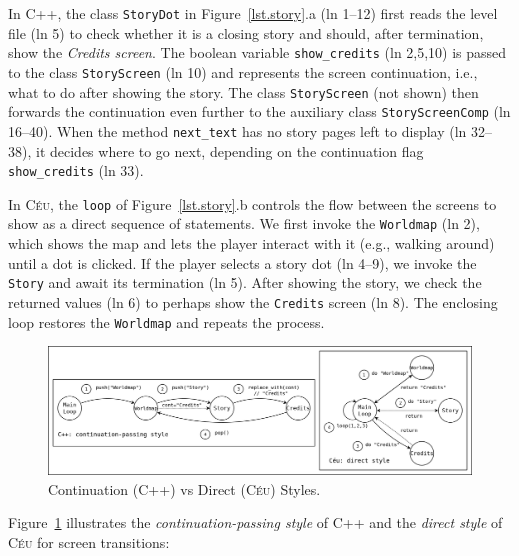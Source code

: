 \documentclass[times,twocolumn,final]{elsarticle}
\newcommand{\CEU}{\textsc{C\'{e}u}\xspace}
\newcommand{\code}[1] {{\small{\texttt{#1}}}}
\begin{document}
In C++, the class \code{StoryDot} in Figure~\ref{lst.story}.a (ln 1--12) first
reads the level file (ln 5) to check whether it is a closing story and should,
after termination, show the \emph{Credits screen}.
%
The boolean variable \code{show\_credits} (ln 2,5,10) is passed to the class
\code{StoryScreen} (ln 10) and represents the screen continuation, i.e., what
to do after showing the story.
The class \code{StoryScreen} (not shown) then forwards the continuation even
further to the auxiliary class \code{StoryScreenComp} (ln 16--40).
%
When the method \code{next\_text} has no story pages left to display
(ln 32--38), it decides where to go next, depending on the continuation flag
\code{show\_credits} (ln 33).

In \CEU, the \code{loop} of Figure~\ref{lst.story}.b controls the flow between
the screens to show as a direct sequence of statements.
%
We first invoke the \code{Worldmap} (ln 2), which shows the map and lets
the player interact with it (e.g., walking around) until a dot is clicked.
If the player selects a story dot (ln 4--9), we invoke the \code{Story}
and await its termination (ln 5).
After showing the story, we check the returned values (ln 6) to perhaps show
the \code{Credits} screen (ln 8).
The enclosing loop restores the \code{Worldmap} and repeats the process.

\begin{figure}
\centering
\includegraphics[width=\textwidth]{continuation}
\caption{ Continuation (C++) vs Direct (\CEU) Styles.
\label{fig.story}
}
\end{figure}

Figure~\ref{fig.story} illustrates the \emph{continuation-passing style} of
C++ and the \emph{direct style} of \CEU for screen transitions:
\end{document}
